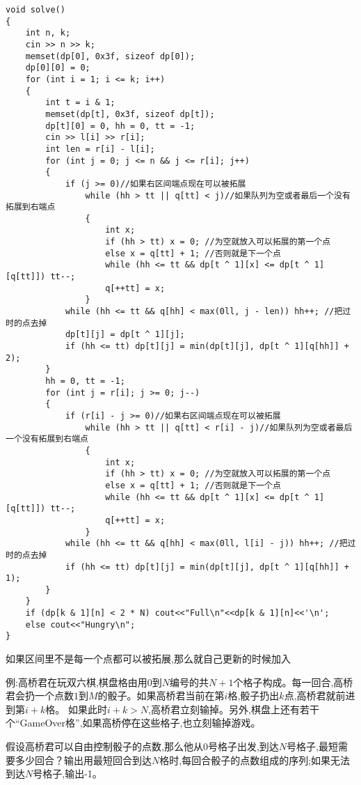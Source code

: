 \documentclass[a4paper, fontset=none]{ctexart}
\begin{document}
\begin{verbatim}
void solve()
{
    int n, k;
    cin >> n >> k;
    memset(dp[0], 0x3f, sizeof dp[0]);
    dp[0][0] = 0;
    for (int i = 1; i <= k; i++)
    {
        int t = i & 1;
        memset(dp[t], 0x3f, sizeof dp[t]);
        dp[t][0] = 0, hh = 0, tt = -1;
        cin >> l[i] >> r[i];
        int len = r[i] - l[i];
        for (int j = 0; j <= n && j <= r[i]; j++)
        {
            if (j >= 0)//如果右区间端点现在可以被拓展
                while (hh > tt || q[tt] < j)//如果队列为空或者最后一个没有拓展到右端点
                {
                    int x;
                    if (hh > tt) x = 0; //为空就放入可以拓展的第一个点
                    else x = q[tt] + 1; //否则就是下一个点
                    while (hh <= tt && dp[t ^ 1][x] <= dp[t ^ 1][q[tt]]) tt--;
                    q[++tt] = x;
                }
            while (hh <= tt && q[hh] < max(0ll, j - len)) hh++; //把过时的点去掉
            dp[t][j] = dp[t ^ 1][j];
            if (hh <= tt) dp[t][j] = min(dp[t][j], dp[t ^ 1][q[hh]] + 2);
        }
        hh = 0, tt = -1;
        for (int j = r[i]; j >= 0; j--)
        {
            if (r[i] - j >= 0)//如果右区间端点现在可以被拓展
                while (hh > tt || q[tt] < r[i] - j)//如果队列为空或者最后一个没有拓展到右端点
                {
                    int x;
                    if (hh > tt) x = 0; //为空就放入可以拓展的第一个点
                    else x = q[tt] + 1; //否则就是下一个点
                    while (hh <= tt && dp[t ^ 1][x] <= dp[t ^ 1][q[tt]]) tt--;
                    q[++tt] = x;
                }
            while (hh <= tt && q[hh] < max(0ll, l[i] - j)) hh++; //把过时的点去掉
            if (hh <= tt) dp[t][j] = min(dp[t][j], dp[t ^ 1][q[hh]] + 1);
        }
    }
    if (dp[k & 1][n] < 2 * N) cout<<"Full\n"<<dp[k & 1][n]<<'\n';
    else cout<<"Hungry\n";
}
\end{verbatim}

如果区间里不是每一个点都可以被拓展,那么就自己更新的时候加入

例:高桥君在玩双六棋,棋盘格由用$0$到$N$编号的共$N+1$个格子构成。每一回合,高桥君会扔一个点数$1$到$M$的骰子。如果高桥君当前在第$i$格,骰子扔出$k$点,高桥君就前进到第$i+k$格。 如果此时$i+k > N$,高桥君立刻输掉。另外,棋盘上还有若干个“GameOver格”,如果高桥停在这些格子,也立刻输掉游戏。

假设高桥君可以自由控制骰子的点数,那么他从$0$号格子出发,到达$N$号格子,最短需要多少回合？输出用最短回合到达$N$格时,每回合骰子的点数组成的序列;如果无法到达$N$号格子,输出-1。
\end{document}
